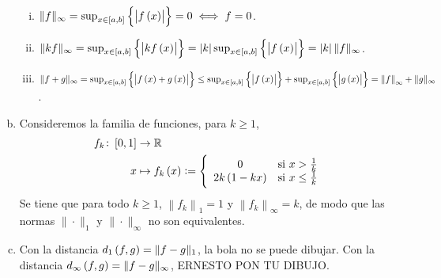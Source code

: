\begin{eje}
\begin{enumerate}[(a)]
\begin{enumerate}[i)]
                \item $\| f \|_{\infty} = \sup_{x\in \left[ a, b \right]} \left\{ \left| f \left( x \right) \right| \right\} = 0 \iff f=0$.
                \item $\| kf \|_{\infty} = \sup_{x\in \left[ a, b \right]} \left\{ \left| kf \left( x \right) \right| \right\} = \left| k \right|\sup_{x\in \left[ a, b \right]} \left\{ \left| f \left( x \right) \right| \right\} = \left| k \right| \| f \|_{\infty}$.
                \item $\| f+g \|_{\infty} = \sup_{x\in \left[ a, b \right]} \left\{ \left| f \left( x \right) + g \left( x \right) \right| \right\} \leq \sup_{x\in \left[ a, b \right]} \left\{ \left| f \left( x \right) \right| \right\} + \sup_{x\in \left[ a, b \right]} \left\{ \left| g \left( x \right) \right| \right\} = \left\| f \right\|_{\infty} + \| g \|_{\infty}$.
            \end{enumerate}
        \item Consideremos la familia de funciones, para $k \geq 1$,
            \begin{align*}
                f_k \colon \left[0, 1  \right] &\to \mathbb{R} \\
                x &\mapsto f_k \left( x \right) := \left\{ \begin{array}{cc}
                    0 & \text{si } x > \frac{1}{k} \\
                    2k\left( 1 - kx \right) & \text{si } x \leq \frac{1}{k}
                \end{array} \right.
            \end{align*}
            Se tiene que para todo $k \geq 1$, $\left\| f_k \right\|_1 = 1$ y $\left\| f_k \right\|_{\infty} = k$, de modo que las normas $\| \cdot \|_1 $ y $\| \cdot \|_{\infty} $ no son equivalentes.
        \item Con la distancia $d_1 \left( f, g \right) = \| f-g \|_1$, la bola no se puede dibujar. Con la distancia $d_{\infty} \left( f, g \right) = \| f-g \|_{\infty}$, ERNESTO PON TU DIBUJO.
        \end{enumerate}
\end{eje}

